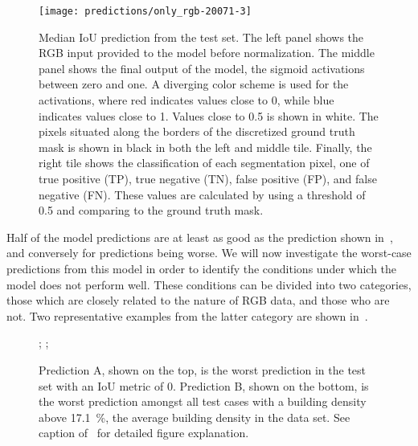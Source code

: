 \begin{figure}[H]
  \centering
  \texttt{[image: predictions/only\_rgb-20071-3]}  %
  \caption{%
    Median IoU prediction from the test set.
    The left panel shows the RGB input provided to the model before normalization.
    The middle panel shows the final output of the model, the sigmoid activations between zero and one.
    A diverging color scheme is used for the activations, where red indicates values close to \num{0}, while blue indicates values close to \num{1}.
    Values close to \num{0.5} is shown in white.
    The pixels situated along the borders of the discretized ground truth mask is shown in black in both the left and middle tile.
    Finally, the right tile shows the classification of each segmentation pixel, one of true positive (TP), true negative (TN), false positive (FP), and false negative (FN).
    These values are calculated by using a threshold of \num{0.5} and comparing to the ground truth mask.
  }%
  \label{fig:rgb-median-prediction}\label{fig:rgb-explanation}
\end{figure}

Half of the model predictions are at least as good as the prediction shown in~, and conversely for predictions being worse.
We will now investigate the worst-case predictions from this model in order to identify the conditions under which the model does not perform well.
These conditions can be divided into two categories, those which are closely related to the nature of RGB data, and those who are not.
Two representative examples from the latter category are shown in~.

\begin{figure}[H]
  \centering
  ;  %
  ;  %
  \caption{%
    Prediction A, shown on the top, is the worst prediction in the test set with an IoU metric of \num{0}.
    Prediction B, shown on the bottom, is the worst prediction amongst all test cases with a building density above \SI{17.1}{\percent}, the average building density in the data set.
    See caption of~ for detailed figure explanation.
  }%
  \label{fig:rgb-fundamental-issues}
\end{figure}

